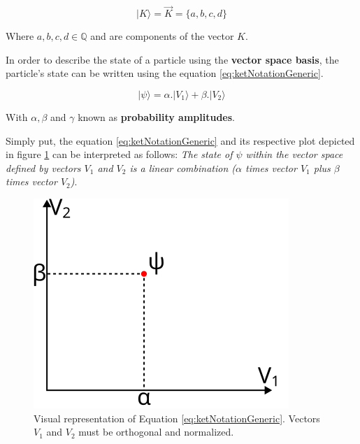 			\begin{equation}
				|K\rangle = \vec{K} = \{a, b, c, d\}
				\label{eq:ketNotationVector}
			\end{equation}
			
			\par Where $a, b, c, d \in \mathbb{Q}$ and are components of the vector $K$.\newline

			\par In order to describe the state of a particle using the \textbf{vector space basis}, the particle's state can be written using the equation \ref{eq:ketNotationGeneric}.
			
			\begin{equation}
				| \psi \rangle = \alpha . | V_1 \rangle + \beta . | V_2 \rangle
				\label{eq:ketNotationGeneric}
			\end{equation}
		
			\par With $\alpha, \beta$ and $\gamma$ known as \textbf{probability amplitudes}.\newline
						
			\par Simply put, the equation \ref{eq:ketNotationGeneric} and its respective plot depicted in figure \ref{fig:diracPlot} can be interpreted as follows: \textit{The state of $\psi$ within the vector space defined by vectors $V_1$ and $V_2$ is a linear combination ($\alpha$ times vector $V_1$ plus $\beta$ times vector $V_2$)}.
			
			\begin{figure}[h]
				\centering
				\includegraphics{images/diracPlot}
				\caption{Visual representation of Equation \ref{eq:ketNotationGeneric}. Vectors $V_1$ and $V_2$ must be orthogonal and normalized.}
				\label{fig:diracPlot}
			\end{figure}
	
